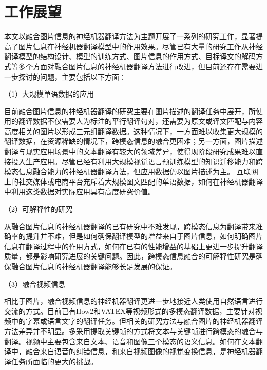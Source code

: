 
\section{工作展望}

本文以融合图片信息的神经机器翻译方法为主题开展了一系列的研究工作，显著提高了图片信息在神经机器翻译模型中的作用效果。尽管已有大量的研究工作从神经翻译模型的结构设计、模型的训练方式、图片信息的作用方式、目标译文的解码方式等多个方面对融合图片信息的神经机器翻译方法进行改进，但目前还存在需要进一步探讨的问题，主要包括以下方面：

（1）大规模单语数据的应用

目前融合图片信息的神经机器翻译的研究主要在图片描述的翻译任务中展开，所使用的翻译数据不仅需要人为标注的平行翻译句对，还需要为原文或译文匹配与内容高度相关的图片以形成三元组翻译数据。这种情况下，一方面难以收集更大规模的翻译数据，在资源稀缺的情况下，跨模态信息的融合更困难；另一方面，图片描述翻译与现实应用场景中的文本翻译有较大的领域差异，使得现阶段研究成果难以直接投入生产应用。尽管已经有利用大规模视觉语言预训练模型的知识迁移能力和跨模态信息融合能力的神经机器翻译方法，但应用数据仍以图片描述为主。
互联网上的社交媒体或电商平台充斥着大规模图文匹配的单语数据，如何在神经机器翻译中利用这类数据对实际应用具有高度研究价值。

（2）可解释性的研究

从融合图片信息的神经机器翻译的已有研究中不难发现，跨模态信息为翻译带来准确率的提升并不难，但是如何确保翻译模型的增益来自于图片信息，如何明确图片信息在翻译过程中的作用方式，如何在已有的性能增益的基础上更进一步提升翻译质量，都是影响研究进展的关键问题。因此，跨模态信息融合的可解释性研究是确保融合图片信息的神经机器翻译能够长足发展的保证。

（3）融合视频信息

相比于图片，融合视频信息的神经机器翻译更进一步地接近人类使用自然语言进行交流的方式。目前已有How2和VATEX等视频形式的多模态翻译数据，主要针对视频中的字幕或语言文字的翻译任务。但相关的研究方法与融合图片的神经机器翻译方法差异并不明显。多采用提取关键帧的方式将文本与关键帧进行跨模态的融合与翻译。视频中主要包含来自文本、语音和图像三个模态的语义信息。如何在文本翻译中，融合来自语音的纠错信息，和来自视频图像的视觉变换信息，是神经机器翻译任务所面临的更大的挑战。
